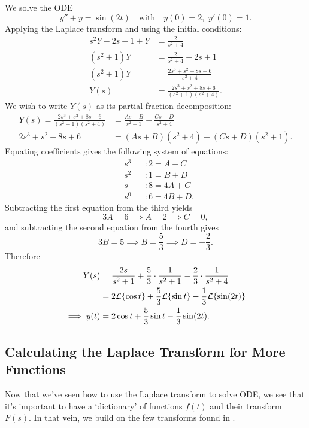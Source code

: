 \begin{eg}
	We solve the ODE
	\[
	y''+y = \sin(2t) \quad\text{with}\quad y(0)=2, \,\,y'(0)=1.
	\]
	Applying the Laplace transform and using the initial conditions:
	\begin{align*}
		s^2Y - 2s - 1 + Y &= \frac{2}{s^2+4} \\
		(s^2+1)Y &= \frac{2}{s^2+4} +2s+1 \\
		(s^2+1)Y &= \frac{2s^3+s^2+8s+6}{s^2+4} \\
		Y(s) &= \frac{2s^3+s^2+8s+6}{(s^2+1)(s^2+4)}.
	\end{align*}
	We wish to write $Y(s)$ as its partial fraction decomposition:
	\begin{align*}
		Y(s) = \frac{2s^3+s^2+8s+6}{(s^2+1)(s^2+4)} &= \frac{As+B}{s^2+1} + \frac{Cs+D}{s^2+4} \\
		2s^3+s^2+8s+6 &= (As+B)(s^2+4) + (Cs+D)(s^2+1).
	\end{align*}
	Equating coefficients gives the following system of equations:
	\begin{equation*}
		\begin{alignedat}{2}
			&s^3 &&: 2 = A+C \\
			&s^2 &&: 1 = B+D \\
			&s &&: 8 = 4A+C \\
			&s^0 &&: 6 = 4B+D.
		\end{alignedat}
	\end{equation*}
	Subtracting the first equation from the third yields
	\[
	3A = 6 \implies A = 2 \implies C=0,
	\]
	and subtracting the second equation from the fourth gives
	\[
	3B = 5 \implies B = \frac53 \implies D = -\frac23.
	\]
	Therefore
	\begin{align*}
		Y(s) &= \frac{2s}{s^2+1} + \frac53\cdot\frac{1}{s^2+1} - \frac23\cdot\frac{1}{s^2+4} \\
		&= 2\mathcal{L}\{\cos{t}\} + \frac53\mathcal{L}\{\sin{t}\} - \frac13\mathcal{L}\{\sin(2t)\} \\
		\implies y(t) &= 2\cos{t} + \frac53\sin{t} - \frac13\sin(2t).
	\end{align*}
\end{eg}

\subsection{Calculating the Laplace Transform for More Functions}

Now that we've seen how to use the Laplace transform to solve ODE, we see that it's important to have a `dictionary' of functions $f(t)$ and their transform $F(s)$. In that vein, we build on the few transforms found in .

